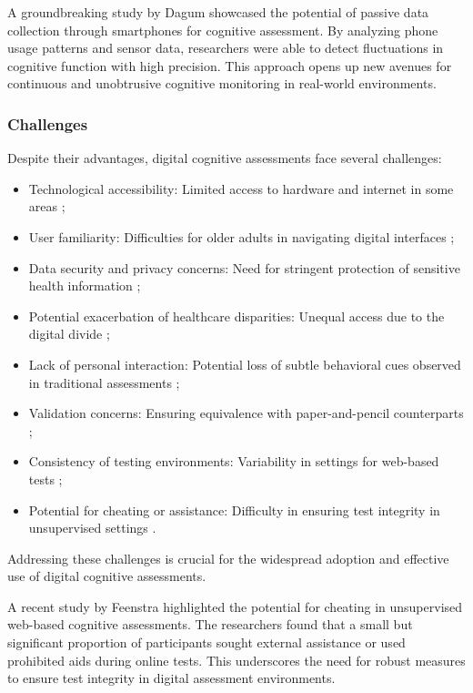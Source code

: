 A groundbreaking study by Dagum \cite{Dagum2018} showcased the potential of passive data collection through smartphones for cognitive assessment. By analyzing phone usage patterns and sensor data, researchers were able to detect fluctuations in cognitive function with high precision. This approach opens up new avenues for continuous and unobtrusive cognitive monitoring in real-world environments.

\subsubsection{Challenges}
Despite their advantages, digital cognitive assessments face several challenges:
\begin{itemize}
    \item Technological accessibility: Limited access to hardware and internet in some areas \cite{Bauer2012};
    \item User familiarity: Difficulties for older adults in navigating digital interfaces \cite{Zygouris2017};
    \item Data security and privacy concerns: Need for stringent protection of sensitive health information \cite{Bhuyan2017};
    \item Potential exacerbation of healthcare disparities: Unequal access due to the digital divide \cite{Rajkomar2018};
    \item Lack of personal interaction: Potential loss of subtle behavioral cues observed in traditional assessments \cite{Bauer2012};
    \item Validation concerns: Ensuring equivalence with paper-and-pencil counterparts \cite{Wild2021};
    \item Consistency of testing environments: Variability in settings for web-based tests \cite{Geddes2020};
    \item Potential for cheating or assistance: Difficulty in ensuring test integrity in unsupervised settings \cite{Feenstra2017}.
\end{itemize}
Addressing these challenges is crucial for the widespread adoption and effective use of digital cognitive assessments.

A recent study by Feenstra \cite{Feenstra2017} highlighted the potential for cheating in unsupervised web-based cognitive assessments. The researchers found that a small but significant proportion of participants sought external assistance or used prohibited aids during online tests. This underscores the need for robust measures to ensure test integrity in digital assessment environments.

